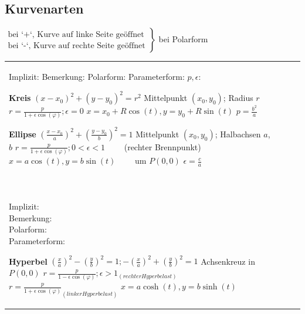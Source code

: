 \subsection{Kurvenarten}
$ \left.\begin{matrix}
	\text{bei `+`, Kurve auf linke Seite geöffnet}\\ 
	\text{bei `-`, Kurve auf rechte Seite geöffnet}

\end{matrix}\right\rbrace $ 
bei Polarform

\begin{tabular}{llll}
\parbox{2.7cm}{
\textbf{ } \\
Implizit:\\
Bemerkung:\\
Polarform:\\
Parameterform:\\
$p, \epsilon$:
}

\parbox{6cm}{
\textbf{Kreis}\\
$(x-x_0)^2 + (y - y_0)^2 = r^2$\\
Mittelpunkt $(x_0, y_0)$; Radius $r$\\
$r = \frac{p}{1 + \epsilon \cos(\varphi)}; \epsilon = 0$\\
$x=x_0 + R\cos(t), y=y_0 + R\sin(t) $ \\
$ p = \frac{b^2}{a}$
} 

\parbox{8cm}{
\textbf{Ellipse}\\
$(\frac{x-x_0}{a})^2 + (\frac{y-y_0}{b})^2 = 1$\\
Mittelpunkt $(x_0, y_0)$; Halbachsen $a$, $b$\\
$r = \frac{p}{1 + \epsilon \cos(\varphi)}; 0 < \epsilon < 1 \qquad$ (rechter Brennpunkt)\\
$x = a\cos(t), y = b\sin(t) \qquad$ um $P(0,0)$ \\
$\epsilon = \frac{c}{a}$
}\\ \\


\parbox{2.7cm}{
\textbf {}\\
Implizit:\\
Bemerkung:\\
Polarform:\\
Parameterform:
}

\parbox{6cm}{
\textbf{Hyperbel}\\ 
$(\frac{x}{a})^2 - (\frac{y}{b})^2 = 1; -(\frac{x}{a})^2 + (\frac{y}{b})^2 =1$\\ 
Achsenkreuz in $P(0,0)$\\
$r = \frac{p}{1 - \epsilon \cos(\varphi)}; \epsilon > 1_{(rechter Hyperbelast)}$\\
$r = \frac{p}{1 + \epsilon \cos(\varphi)}_{(linker Hyperbelast)}$ \\
$x= a \cosh(t), y = b \sinh(t) $ 

}
\end{tabular}
